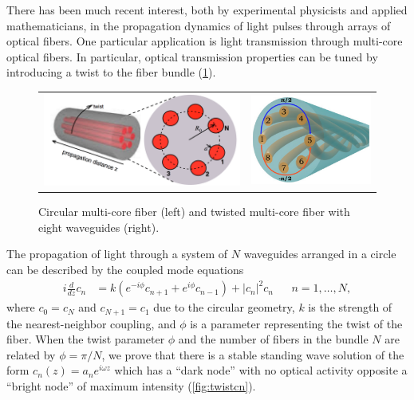 \documentclass[12pt,reqno,oneside,hidelinks]{article}
\begin{document}
There has been much recent interest, both by experimental physicists and applied mathematicians, in the propagation dynamics of light pulses through arrays of optical fibers. One particular application is light transmission through multi-core optical fibers. In particular, optical transmission properties can be tuned by introducing a twist to the fiber bundle \cite{Longhi2016,CastroCastro2016,Parto2017} (\cref{fig:twist}).
\begin{figure}
\begin{center}
\begin{tabular}{cc}
\includegraphics[width=7cm]{images/twist2.png} &
\includegraphics[width=4.25cm]{images/twistmulticore.png}
\end{tabular}
\end{center}
\caption{Circular multi-core fiber \cite{Longhi2016} (left) and twisted multi-core fiber with eight waveguides \cite{Parto2017} (right).}
\label{fig:twist}
\end{figure}
The propagation of light through a system of $N$ waveguides arranged in a circle can be described by the coupled mode equations
\begin{align*}
i \frac{d}{dz} c_n &= k \left(e^{-i\phi}c_{n+1} + e^{i\phi}c_{n-1}\right) + |c_n|^2 c_n &&  n = 1, \dots, N,
\end{align*}
 where $c_0 = c_{N}$ and $c_{N+1} = c_1$ due to the circular geometry, $k$ is the strength of the nearest-neighbor coupling, and $\phi$ is a parameter representing the twist of the fiber.  When the twist parameter $\phi$ and the number of fibers in the bundle $N$ are related by $\phi = \pi/N$, we prove that there is a stable standing wave solution of the form $c_n(z) = a_n e^{i \omega z}$ which has a ``dark node'' with no optical activity opposite a ``bright node'' of maximum intensity \cite{ParkerTwist} (\cref{fig:twistcn}). 
\end{document}
